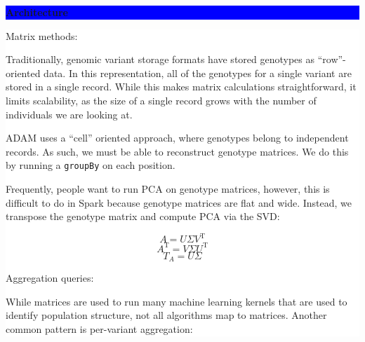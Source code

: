 \documentclass[11pt]{a0poster}
\begin{document}
{\begin{minipage}[t][2045pt][t]{\linewidth}
\begin{minipage}{0.6\linewidth}
\vspace{70pt}
\colorbox{Blue}{
\begin{minipage}[t]{\linewidth}
\vspace{30pt}
\begin{center}
\Huge \bf \color{White} Architecture
\end{center}
\vspace{17pt}
\end{minipage}
}
\colorbox{White}{
\begin{minipage}[t][1170pt][t]{\linewidth}
\begin{minipage}{0.01\linewidth}
\hfill
\pagebreak
\end{minipage}
\begin{minipage}{0.48\linewidth}
\vspace{-25pt}
\color{Blue}
\begin{center}
\huge Matrix methods:
\end{center}
\LARGE
Traditionally, genomic variant storage formats have stored genotypes as
``row''-oriented data. In this representation, all of the genotypes for a
single variant are stored in a single record. While this makes matrix
calculations straightforward, it limits scalability, as the size of a
single record grows with the number of individuals we are looking at.

\vspace{20pt}

ADAM uses a ``cell'' oriented approach, where genotypes belong
to independent records. As such, we must be able to reconstruct genotype
matrices. We do this by running a \texttt{groupBy} on each position.

\vspace{20pt}

Frequently, people want to run PCA on genotype matrices, however, this
is difficult to do in Spark because genotype matrices are flat and wide.
Instead, we transpose the genotype matrix and compute PCA via the SVD:

\vspace{-40pt}
\begin{center}
$$
A = U \Sigma V^{\text{T}}
$$
$$
A^{\text{T}} = V \Sigma U^{\text{T}}
$$
$$
T_A = U \Sigma
$$
\end{center}
\end{minipage}
\begin{minipage}{0.01\linewidth}
\hfill
\pagebreak
\end{minipage}
\begin{minipage}{0.48\linewidth}
\vspace{30pt}
\hspace{100pt}
\color{Blue}
\vspace{-50pt}
\begin{center}
\huge Aggregation queries:
\end{center}
\LARGE
While matrices are used to run many machine learning kernels that are used to
identify population structure, not all algorithms map to matrices. Another
common pattern is per-variant aggregation:


\end{minipage}
\end{minipage}}
\end{minipage}
\end{minipage}}
\end{document}
